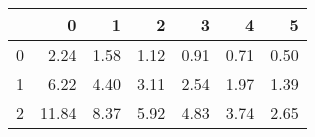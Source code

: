 \begin{tabular}{lrrrrrr}
\toprule
{} &      0 &     1 &     2 &     3 &     4 &     5 \\
\midrule
0 &   2.24 &  1.58 &  1.12 &  0.91 &  0.71 &  0.50 \\
1 &   6.22 &  4.40 &  3.11 &  2.54 &  1.97 &  1.39 \\
2 &  11.84 &  8.37 &  5.92 &  4.83 &  3.74 &  2.65 \\
\bottomrule
\end{tabular}
